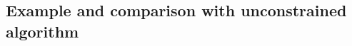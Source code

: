 \documentclass{article}
\DeclareMathOperator*{\argmin}{arg\,min}
\begin{document}



\subsection{Example and comparison with unconstrained algorithm}
\label{sec:example-comparison}
\end{document}
